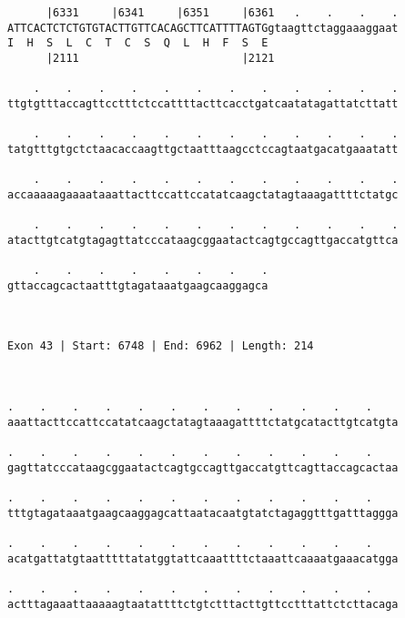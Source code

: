 \documentclass{article}
\begin{document}
\begin{Verbatim}
      |6331     |6341     |6351     |6361   .    .    .    .
ATTCACTCTCTGTGTACTTGTTCACAGCTTCATTTTAGTGgtaagttctaggaaaggaat
I  H  S  L  C  T  C  S  Q  L  H  F  S  E                    
      |2111                         |2121                   
  
    .    .    .    .    .    .    .    .    .    .    .    .
ttgtgtttaccagttcctttctccattttacttcacctgatcaatatagattatcttatt
                                                            
    .    .    .    .    .    .    .    .    .    .    .    .
tatgtttgtgctctaacaccaagttgctaatttaagcctccagtaatgacatgaaatatt
                                                            
    .    .    .    .    .    .    .    .    .    .    .    .
accaaaaagaaaataaattacttccattccatatcaagctatagtaaagattttctatgc
                                                            
    .    .    .    .    .    .    .    .    .    .    .    .
atacttgtcatgtagagttatcccataagcggaatactcagtgccagttgaccatgttca
                                                            
    .    .    .    .    .    .    .    .
gttaccagcactaatttgtagataaatgaagcaaggagca
                                        
                                        
 
Exon 43 | Start: 6748 | End: 6962 | Length: 214



.    .    .    .    .    .    .    .    .    .    .    .    
aaattacttccattccatatcaagctatagtaaagattttctatgcatacttgtcatgta
                                                            
.    .    .    .    .    .    .    .    .    .    .    .    
gagttatcccataagcggaatactcagtgccagttgaccatgttcagttaccagcactaa
                                                            
.    .    .    .    .    .    .    .    .    .    .    .    
tttgtagataaatgaagcaaggagcattaatacaatgtatctagaggtttgatttaggga
                                                            
.    .    .    .    .    .    .    .    .    .    .    .    
acatgattatgtaatttttatatggtattcaaattttctaaattcaaaatgaaacatgga
                                                            
.    .    .    .    .    .    .    .    .    .    .    .    
actttagaaattaaaaagtaatattttctgtctttacttgttcctttattctcttacaga
                                                            

\end{Verbatim}
\end{document}
